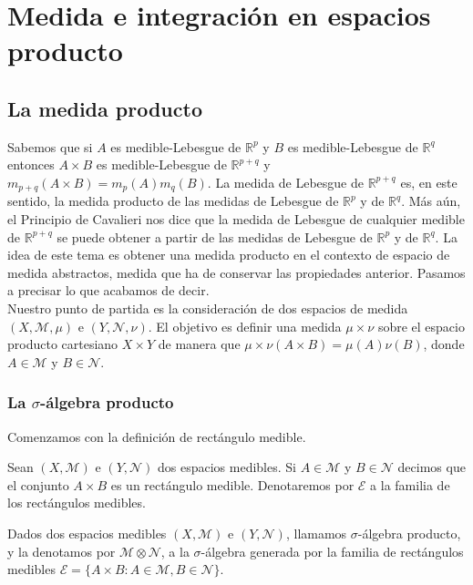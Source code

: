 \chapter{Medida e integración en espacios producto}

\section{La medida producto}

Sabemos que si $A$ es medible-Lebesgue de $\mathbb{R}^p$ y $B$ es medible-Lebesgue de $\mathbb{R}^q$ entonces $A \times B$ es medible-Lebesgue de $\mathbb{R}^{p+q}$ y $m_{p+q}(A \times B) = m_p(A)m_q(B)$. La medida de Lebesgue de $\mathbb{R}^{p+q}$ es, en este sentido, la medida producto de las medidas de Lebesgue de $\mathbb{R}^p$ y de $\mathbb{R}^q$. Más aún, el Principio de Cavalieri nos dice que la medida de Lebesgue de cualquier medible de $\mathbb{R}^{p+q}$ se puede obtener a partir de las medidas de Lebesgue de $\mathbb{R}^p$ y de $\mathbb{R}^{q}$. La idea de este tema es obtener una medida producto en el contexto de espacio de medida abstractos, medida que ha de conservar las propiedades anterior. Pasamos a precisar lo que acabamos de decir.
\\
\newline
Nuestro punto de partida es la consideración de dos espacios de medida $(X, \mathcal{M}, \mu)$ e $(Y, \mathcal{N}, \nu)$. El objetivo es definir una medida $\mu \times \nu$ sobre el espacio producto cartesiano $X \times Y$ de manera que $\mu \times \nu(A \times B) = \mu(A)\nu(B)$, donde $A \in \mathcal{M}$ y $B \in \mathcal{N}$.

\subsection{La $\sigma$-álgebra producto}
Comenzamos con la definición de rectángulo medible.

\begin{defi}
Sean $(X, \mathcal{M})$ e $(Y, \mathcal{N})$ dos espacios medibles. Si $A \in \mathcal{M}$ y $B \in \mathcal{N}$ decimos que el conjunto $A \times B$ es un rectángulo medible. Denotaremos por $\mathcal{E}$ a la familia de los rectángulos medibles.
\end{defi}

\begin{defi}
Dados dos espacios medibles $(X, \mathcal{M})$ e $(Y, \mathcal{N})$, llamamos $\sigma$-álgebra producto, y la denotamos por $\mathcal{M} \otimes \mathcal{N}$, a la $\sigma$-álgebra generada por la familia de rectángulos medibles $\mathcal{E} = \{ A \times B : A \in \mathcal{M}, B \in \mathcal{N}\}$.
\end{defi}

